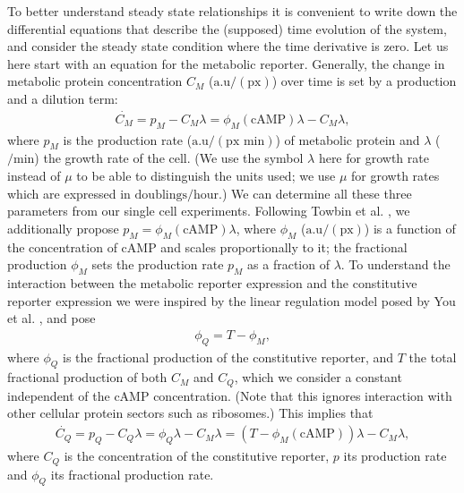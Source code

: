 To better understand steady state relationships it is convenient to write down the differential equations that describe the (supposed) time evolution of the system, 
and consider the steady state condition where the time derivative is zero.
%
Let us here start with an equation for the metabolic reporter.
%
Generally, the change in metabolic protein concentration $C_M$ ($\text{a.u}/(\text{px})$) over time is set by a production and a dilution term:
\begin{align}
	\label{eq:CRP:odeM}
	\dot{C_M} = p_M - C_M \lambda = \phi_M(\text{cAMP}) \lambda -  C_M \lambda
	,
\end{align}
% 
where $p_M$ is the production rate ($\text{a.u}/(\text{px min})$) of metabolic protein and $\lambda$ ($/\text{min}$) the growth rate of the cell.
(We use the symbol $\lambda$ here for growth rate instead of $\mu$ to be able to distinguish the units used; we use $\mu$ for growth rates which are expressed in $\text{doublings}/\text{hour}$.) 
We can determine all these three parameters from our single cell experiments.
Following Towbin et al. \cite{Towbin2017}, we additionally propose $p_M = \phi_M(\text{cAMP}) \lambda$, where $\phi_M$ ($\text{a.u}/(\text{px})$) is a function of the concentration of cAMP and scales proportionally to it; the fractional production $\phi_M$ sets the production rate $p_M$ as a fraction of $\lambda$.
%
To understand the interaction between the metabolic reporter expression and the constitutive reporter expression we were inspired by the linear regulation model posed by You et al. \cite{You2013}, and pose
\begin{align}
	\label{eq:CRP:relationMQ}
	\phi_Q = T - \phi_M
	,
\end{align}
where $\phi_Q$ is the fractional production of the constitutive reporter, and $T$ the total fractional production of both $C_M$ and $C_Q$, which we consider a constant independent of the cAMP concentration. 
(Note that this ignores interaction with other cellular protein sectors such as ribosomes.) 
%
This implies that
\begin{align}
	\label{eq:CRP:odeQ}
	\dot{C_Q} = p_Q - C_Q \lambda = \phi_Q \lambda -  C_M \lambda = (T - \phi_M(\text{cAMP})) \lambda -  C_M \lambda
	,
\end{align}
where $C_Q$ is the concentration of the constitutive reporter, $p$ its production rate and $\phi_Q$ its fractional production rate.

